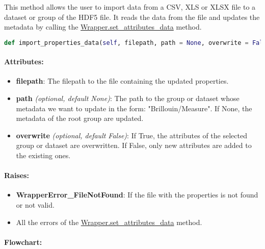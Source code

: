 This method allows the user to import data from a CSV, XLS or XLSX file to a dataset or group of the HDF5 file. It reads the data from the file and updates the metadata by calling the \hyperref[subsec:wrapper.set_attributes_data]{Wrapper.set\_attributes\_data} method.

\begin{lstlisting}[language=Python]
def import_properties_data(self, filepath, path = None, overwrite = False):
\end{lstlisting}

\paragraph{Attributes:}

\begin{itemize}
    \item \textbf{filepath}: The filepath to the file containing the updated properties.
    \item \textbf{path} \textit{(optional, default None)}: The path to the group or dataset whose metadata we want to update in the form: "Brillouin/Measure". If None, the metadata of the root group are updated.
    \item \textbf{overwrite} \textit{(optional, default False)}: If True, the attributes of the selected group or dataset are overwritten. If False, only new attributes are added to the existing ones.
\end{itemize}

\paragraph{Raises:}
\begin{itemize}
    \item \textbf{WrapperError\_FileNotFound}: If the file with the properties is not found or not valid.
    \item All the errors of the \hyperref[subsec:wrapper.set_attributes_data]{Wrapper.set\_attributes\_data} method.
\end{itemize}


\paragraph{Flowchart:}

